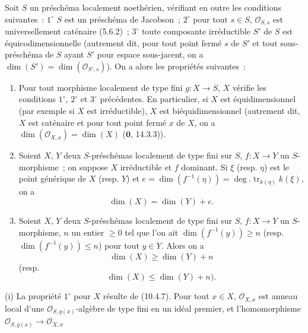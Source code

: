 \begin{proposition}[10.6.1]
\label{IV.10.6.1-fr}
Soit $S$ un préschéma localement noethérien, vérifiant en outre les conditions
suivantes~: $1^\circ$ $S$ est un préschéma de Jacobson~; $2^\circ$ pour tout
$s\in S$, $\mathcal O_{S,s}$ est universellement caténaire (5.6.2)~; $3^\circ$ toute
composante irréductible $S'$ de $S$ est équicodimensionnelle (autrement dit, pour
tout point fermé $s$ de $S'$ et tout sous-préschéma de $S$ ayant $S'$ pour espace
sous-jacent, on a $\dim(S')=\dim(\mathcal O_{S',s})$). On a alors les propriétés
suivantes~:
\begin{enumerate}[label=(\roman*)]
  \item Pour tout morphisme localement de type fini $g:X\to S$, $X$ vérifie les
  conditions $1^\circ$, $2^\circ$ et $3^\circ$ précédentes. En particulier, si $X$
  est équidimensionnel (par exemple si $X$ est irréductible), $X$ est
  biéquidimensionnel (autrement dit, $X$ est caténaire et pour tout point fermé
  $x$ de $X$, on a $\dim(\mathcal O_{X,x})=\dim(X)$ ($\mathbf 0$, 14.3.3)).
  \item Soient $X$, $Y$ deux $S$-préschémas localement de type fini sur $S$,
  $f:X\to Y$ un $S$-morphisme~; on suppose $X$ irréductible et $f$ dominant. Si
  $\xi$ (resp. $\eta$) est le point générique de $X$ (resp. $Y$) et
  $e=\dim(f^{-1}(\eta))=\deg.\operatorname{tr}_{k(\eta)}k(\xi)$, on a
  \begin{equation}
  \label{IV.10.6.1.1-fr}
  \tag{10.6.1.1}
  \dim(X)=\dim(Y)+e.
  \end{equation}
  \item Soient $X$, $Y$ deux $S$-préschémas localement de type fini sur $S$,
  $f:X\to Y$ un $S$-morphisme, $n$ un entier $\geq0$ tel que l'on ait
  $\dim(f^{-1}(y))\geq n$ (resp. $\dim(f^{-1}(y))\leq n$) pour tout $y\in Y$.
  Alors on a
  \begin{equation}
  \label{IV.10.6.1.2-fr}
  \tag{10.6.1.2}
  \dim(X)\geq\dim(Y)+n
  \end{equation}
  (resp.
  \begin{equation}
  \label{IV.10.6.1.3-fr}
  \tag{10.6.1.3}
  \dim(X)\leq\dim(Y)+n).
  \end{equation}
\end{enumerate}
\end{proposition}

(i) La propriété $1^\circ$ pour $X$ résulte de (10.4.7). Pour tout $x\in X$,
$\mathcal O_{X,x}$ est anneau local d'une $\mathcal O_{S,g(x)}$-algèbre de type fini en
un idéal premier, et l'homomorphisme
$\mathcal O_{S,g(x)}\to\mathcal O_{X,x}$


